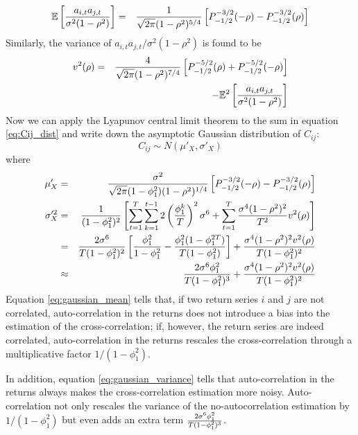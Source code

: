 \begin{eqnarray*}
  \mathbb{E}\left[{a_{i,t}a_{j,t} \over \sigma^2 (1 - \rho^2)}\right]
  &=&
  {1 \over \sqrt{2\pi} (1 - \rho^2)^{5/4}} \left[
    P^{-3/2}_{-1/2}(-\rho) - P^{-3/2}_{-1/2}(\rho)
  \right]
\end{eqnarray*}
Similarly, the variance of $a_{i,t}a_{j,t}/\sigma^2 (1 - \rho^2)$ is
found to be
\begin{eqnarray*}
  v^2(\rho) &=&
  {4 \over \sqrt{2\pi} (1 - \rho^2)^{7/4}} \left[
    P^{-5/2}_{-1/2}(\rho) + P^{-5/2}_{-1/2}(-\rho)
  \right] \\
  && - \mathbb{E}^2\left[{a_{i,t}a_{j,t} \over
      \sigma^2 (1 - \rho^2)}\right]
\end{eqnarray*}
Now we can apply the Lyapunov central limit theorem
\cite{Billingsley1995} to the sum in equation \ref{eq:Cij_dist}
and write down the asymptotic Gaussian distribution of $C_{ij}$:
\begin{equation*}
C_{ij} \sim N(\mu'_X, \sigma'_X)
\end{equation*}
where
\begin{eqnarray}
  \mu'_X &=& {\sigma^2 \over \sqrt{2\pi} (1 - \phi_1^2)(1 -
    \rho^2)^{1/4}} \left[ P^{-3/2}_{-1/2}(-\rho) -
    P^{-3/2}_{-1/2}(\rho)
  \right] \label{eq:gaussian_mean}\\
  \sigma'^2_X &=& {1 \over (1 - \phi_1^2)^2}\left[
    \sum_{t=1}^T \sum_{k=1}^{t-1} 2\left(
      \phi_1^k \over T
    \right)^2 \sigma^6 + \sum_{t=1}^T
    {\sigma^4 (1 - \rho^2)^2 \over T^2} v^2(\rho)
  \right] \nonumber \\
  &=& {2 \sigma^6 \over T (1 - \phi_1^2)^2} \left[
    {\phi_1^2 \over 1 - \phi_1^2} -
    {\phi_1^2 (1 - \phi_1^{2T}) \over
      T(1 - \phi_1^2)}
  \right] + {\sigma^4 (1 - \rho^2)^2 v^2(\rho) \over
    T (1 - \phi_1^2)^2} \nonumber \\
  &\approx& {2 \sigma^6 \phi_1^2 \over T (1 - \phi_1^2)^3}
  + {\sigma^4 (1 - \rho^2)^2 v^2(\rho) \over
    T (1 - \phi_1^2)^2} \label{eq:gaussian_variance}
\end{eqnarray}
Equation \ref{eq:gaussian_mean} tells that, if two return series $i$
and $j$ are not correlated, auto-correlation in the returns does not
introduce a bias into the estimation of the cross-correlation; if,
however, the return series are indeed correlated, auto-correlation
in the returns rescales the cross-correlation through a multiplicative
factor $1/(1 - \phi_1^2)$.

In addition, equation \ref{eq:gaussian_variance} tells that
auto-correlation in the returns always makes the cross-correlation
estimation more noisy. Auto-correlation not only rescales the variance
of the no-autocorrelation estimation by $1/(1 - \phi_1^2)$ but even
adds an extra term ${2 \sigma^6 \phi_1^2 \over T (1 - \phi_1^2)^3}$.

